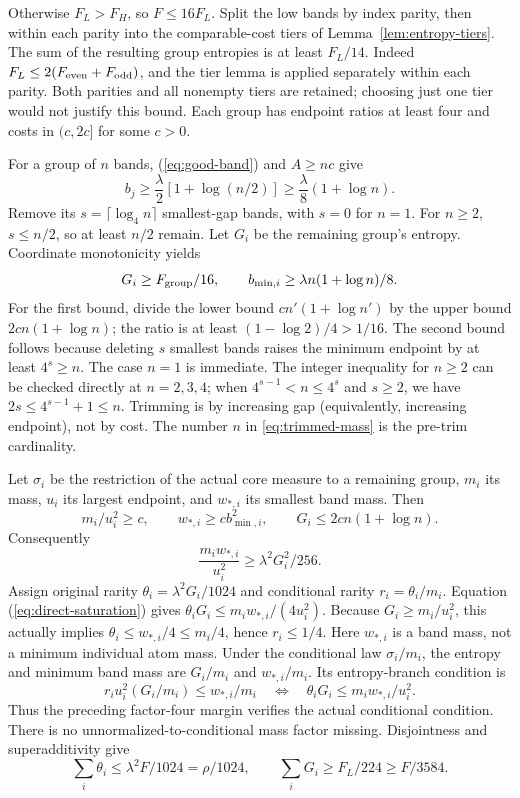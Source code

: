 Otherwise $F_L>F_H$, so $F\le16F_L$.
Split the low bands by index parity, then within each parity into the
comparable-cost tiers of Lemma~\ref{lem:entropy-tiers}.
The sum of the resulting group entropies is at least $F_L/14$.
Indeed $F_L\le2(F_{\rm even}+F_{\rm odd})$, and the tier lemma is
applied separately within each parity. Both parities and all nonempty
tiers are retained; choosing just one tier would not justify this bound.
Each group has endpoint ratios at least four and costs in $(c,2c]$
for some $c>0$.

For a group of $n$ bands, (\ref{eq:good-band}) and $A\ge nc$ give
\[
 b_j\ge\frac\lambda2[1+\log(n/2)]
       \ge\frac\lambda8(1+\log n).
\]
Remove its $s=\lceil\log_4n\rceil$ smallest-gap bands, with $s=0$
for $n=1$. For $n\ge2$, $s\le n/2$, so at least $n/2$ remain.
Let $G_i$ be the remaining group's entropy. Coordinate monotonicity yields
\begin{equation}\label{eq:trimmed-mass}
 G_i\ge F_{\rm group}/16,\qquad
 b_{\min,i}\ge\lambda n(1+\log n)/8.
\end{equation}
For the first bound, divide the lower bound
$cn'(1+\log n')$ by the upper bound $2cn(1+\log n)$;
the ratio is at least $(1-\log2)/4>1/16$.
The second bound follows because deleting $s$ smallest bands raises
the minimum endpoint by at least $4^s\ge n$.
The case $n=1$ is immediate. The integer inequality for $n\ge2$
can be checked directly at $n=2,3,4$; when
$4^{s-1}<n\le4^s$ and $s\ge2$, we have
$2s\le4^{s-1}+1\le n$. Trimming is by increasing gap (equivalently,
increasing endpoint), not by cost. The number $n$ in
\eqref{eq:trimmed-mass} is the pre-trim cardinality.

Let $\sigma_i$ be the restriction of the actual core measure to a
remaining group, $m_i$ its mass, $u_i$ its largest endpoint, and
$w_{*,i}$ its smallest band mass. Then
\[
 m_i/u_i^2\ge c,\qquad w_{*,i}\ge c b_{\min,i}^2,
 \qquad G_i\le2cn(1+\log n).
\]
Consequently
\begin{equation}\label{eq:direct-saturation}
                 \frac{m_iw_{*,i}}{u_i^2}\ge\lambda^2G_i^2/256.
\end{equation}
Assign original rarity $\theta_i=\lambda^2G_i/1024$ and conditional
rarity $r_i=\theta_i/m_i$.
Equation (\ref{eq:direct-saturation}) gives
$\theta_iG_i\le m_iw_{*,i}/(4u_i^2)$.
Because $G_i\ge m_i/u_i^2$, this actually implies
$\theta_i\le w_{*,i}/4\le m_i/4$, hence $r_i\le1/4$.
Here $w_{*,i}$ is a band mass, not a minimum individual atom mass.
Under the conditional law $\sigma_i/m_i$, the entropy and minimum
band mass are $G_i/m_i$ and $w_{*,i}/m_i$. Its entropy-branch condition is
\[
 r_i u_i^2(G_i/m_i)\le w_{*,i}/m_i
 \quad\Longleftrightarrow\quad
 \theta_iG_i\le m_iw_{*,i}/u_i^2.
\]
Thus the preceding factor-four margin verifies the actual conditional
condition. There is no unnormalized-to-conditional mass factor missing.
Disjointness and superadditivity give
\[
 \sum_i\theta_i\le\lambda^2F/1024=\rho/1024,
 \qquad \sum_iG_i\ge F_L/224\ge F/3584.
\]

